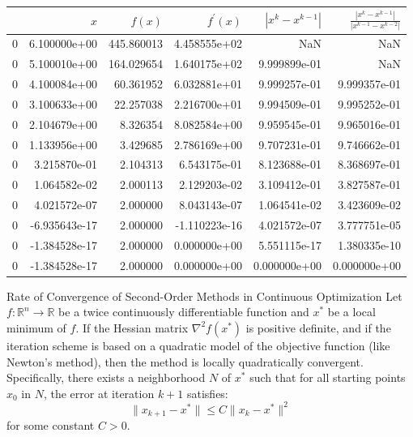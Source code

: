 \begin{tabular}{lrrrrr}
\toprule
{} &           $x$ &      $f(x)$ &  $f^\prime(x)$ &  $|x^k - x^{k-1}|$ &  $\frac{|x^ k - x^{k-1}|}{|x^{k-1} - x^{k-2}|}$ \\
\midrule
0 &  6.100000e+00 &  445.860013 &   4.458555e+02 &                NaN &                                            NaN \\
0 &  5.100010e+00 &  164.029654 &   1.640175e+02 &       9.999899e-01 &                                            NaN \\
0 &  4.100084e+00 &   60.361952 &   6.032881e+01 &       9.999257e-01 &                                   9.999357e-01 \\
0 &  3.100633e+00 &   22.257038 &   2.216700e+01 &       9.994509e-01 &                                   9.995252e-01 \\
0 &  2.104679e+00 &    8.326354 &   8.082584e+00 &       9.959545e-01 &                                   9.965016e-01 \\
0 &  1.133956e+00 &    3.429685 &   2.786169e+00 &       9.707231e-01 &                                   9.746662e-01 \\
0 &  3.215870e-01 &    2.104313 &   6.543175e-01 &       8.123688e-01 &                                   8.368697e-01 \\
0 &  1.064582e-02 &    2.000113 &   2.129203e-02 &       3.109412e-01 &                                   3.827587e-01 \\
0 &  4.021572e-07 &    2.000000 &   8.043143e-07 &       1.064541e-02 &                                   3.423609e-02 \\
0 & -6.935643e-17 &    2.000000 &  -1.110223e-16 &       4.021572e-07 &                                   3.777751e-05 \\
0 & -1.384528e-17 &    2.000000 &   0.000000e+00 &       5.551115e-17 &                                   1.380335e-10 \\
0 & -1.384528e-17 &    2.000000 &   0.000000e+00 &       0.000000e+00 &                                   0.000000e+00\\
\hline
\end{tabular}


\begin{theorem}{Rate of Convergence of Second-Order Methods in Continuous Optimization}{}
Let $ f: \mathbb{R}^n \rightarrow \mathbb{R} $ be a twice continuously differentiable function and $ x^* $ be a local minimum of $ f $. If the Hessian matrix $ \nabla^2 f(x^*) $ is positive definite, and if the iteration scheme is based on a quadratic model of the objective function (like Newton's method), then the method is locally quadratically convergent. Specifically, there exists a neighborhood $ N $ of $ x^* $ such that for all starting points $ x_0 $ in $ N $, the error at iteration $ k+1 $ satisfies:
\[
\| x_{k+1} - x^* \| \leq C \| x_k - x^* \|^2
\]
for some constant $ C > 0 $.
\end{theorem}

